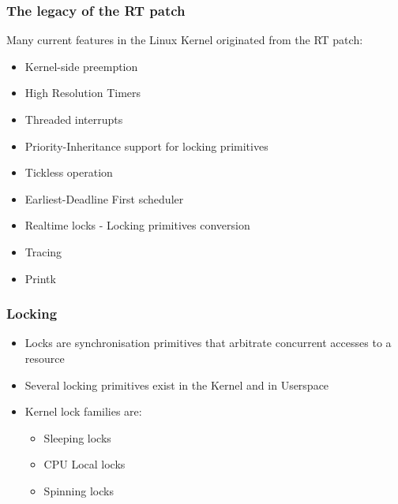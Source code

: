 \begin{frame}
  \frametitle{The legacy of the RT patch}
  Many current features in the Linux Kernel originated from the RT patch:
        \begin{itemize}
                \item Kernel-side preemption
                \item High Resolution Timers
                \item Threaded interrupts
                \item Priority-Inheritance support for locking primitives
                \item Tickless operation
                \item Earliest-Deadline First scheduler
                \item Realtime locks - Locking primitives conversion
                \item Tracing
                \item Printk
        \end{itemize}
\end{frame}


\begin{frame}
  \frametitle{Locking}
        \begin{itemize}
                \item Locks are synchronisation primitives that arbitrate concurrent accesses to a resource
                \item Several locking primitives exist in the Kernel and in Userspace
                \item Kernel lock families are:
                        \begin{itemize}
                                \item Sleeping locks
                                \item CPU Local locks
                                \item Spinning locks
                        \end{itemize}
        \end{itemize}
\end{frame}

